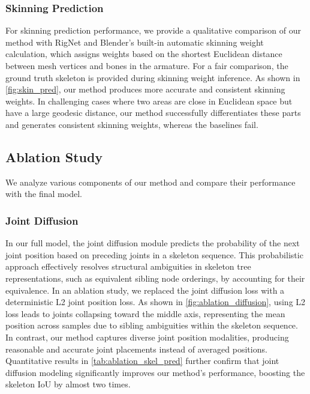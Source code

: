 

\subsubsection{Skinning Prediction}

For skinning prediction performance, we provide a qualitative comparison of our method with RigNet and Blender's built-in automatic skinning weight calculation, which assigns weights based on the shortest Euclidean distance between mesh vertices and bones in the armature. For a fair comparison, the ground truth skeleton is provided during skinning weight inference. As shown in \cref{fig:skin_pred}, our method produces more accurate and consistent skinning weights. In challenging cases where two areas are close in Euclidean space but have a large geodesic distance, our method successfully differentiates these parts and generates consistent skinning weights, whereas the baselines fail.

\subsection{Ablation Study} \label{sec:ablation}

We analyze various components of our method and compare their performance with the final model.

\subsubsection{Joint Diffusion} In our full model, the joint diffusion module predicts the probability of the next joint position based on preceding joints in a skeleton sequence. This probabilistic approach effectively resolves structural ambiguities in skeleton tree representations, such as equivalent sibling node orderings, by accounting for their equivalence. In an ablation study, we replaced the joint diffusion loss with a deterministic L2 joint position loss. As shown in \cref{fig:ablation_diffusion}, using L2 loss leads to joints collapsing toward the middle axis, representing the mean position across samples due to sibling ambiguities within the skeleton sequence. In contrast, our method captures diverse joint position modalities, producing reasonable and accurate joint placements instead of averaged positions. Quantitative results in \cref{tab:ablation_skel_pred} further confirm that joint diffusion modeling significantly improves our method’s performance, boosting the skeleton IoU by almost two times.

